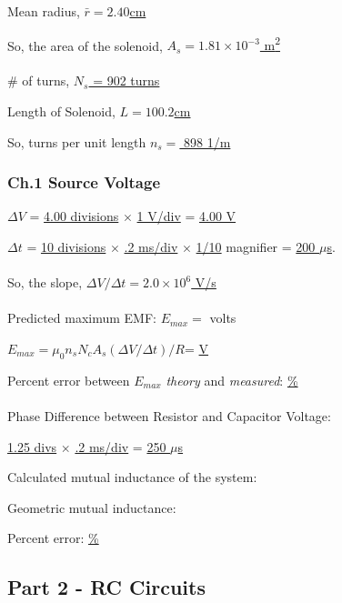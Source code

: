\documentclass[twocolumn,english]{IEEEtran}
\theoremstyle{plain}
\theoremstyle{plain}
\begin{document}
Mean radius, \hfill\underline{$\bar{r} = 2.40$cm}

So, the area of the solenoid, \hfill\underline{$A_s = 1.81 \times 10^{-3}$ m\textsuperscript{2}}\\ \\

\# of turns, \hfill\underline{ $N_s$ = 902 turns}

Length of Solenoid, \hfill \underline{$L = 100.2$cm}

So, turns per unit length \hfill\underline{$n_s = $ 898 1/m}

\subsubsection{Ch.1 Source Voltage}

$\Delta V$ = \underline{4.00 divisions}  $\times$ \underline{1 V/div} \hfill= \underline{4.00 V}

$\Delta t$ = \underline{10 divisions} $\times$ \underline{.2 ms/div}  $\times$ \underline{1/10} magnifier \hfill= \underline{200 $\mu$s}. \\ \\

So, the slope, \hfill$\Delta V/\Delta t = $\underline{$2.0 \times 10^6$ V/s} \\ \\

Predicted maximum EMF: \hfill $E_{max} = $ \underline{} volts

$E_{max} = \mu_0 n_s N_c A_s (\Delta V / \Delta t)/R $\hfill = \underline{V}

Percent error between $E_{max}$ \textit{theory} and \textit{measured}: \hfill\underline{\%} \\ \\

Phase Difference between Resistor and Capacitor Voltage:

\underline{1.25 divs} $\times$ \underline{.2 ms/div} = \hfill\underline{250 $\mu$s}

\hrulefill

Calculated mutual inductance of the system: \underline{}

Geometric mutual inductance: \underline{}

Percent error: \underline{\%}

\hrulefill


\subsection{Part 2 - RC Circuits}
\end{document}
